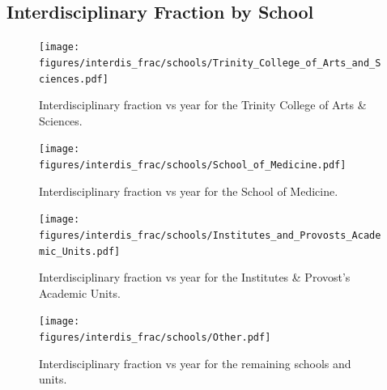 \documentclass[notitlepage,aps,prd,nofootinbib]{revtex4-1}
\newcommand{\figures}{../outputs/plots}
\begin{document}
\begin{appendices}
\section{Interdisciplinary Fraction by School}

\begin{figure}[!htb]\centering
  \texttt{[image: \\figures/interdis\_frac/schools/Trinity\_College\_of\_Arts\_and\_Sciences.pdf]}
  \caption{Interdisciplinary fraction vs year for the Trinity College of Arts \& Sciences.}
\end{figure}

\begin{figure}[!htb]\centering
  \texttt{[image: \\figures/interdis\_frac/schools/School\_of\_Medicine.pdf]}
  \caption{Interdisciplinary fraction vs year for the School of Medicine.}
\end{figure}

\begin{figure}[!htb]\centering
  \texttt{[image: \\figures/interdis\_frac/schools/Institutes\_and\_Provosts\_Academic\_Units.pdf]}
  \caption{Interdisciplinary fraction vs year for the Institutes \& Provost's Academic Units.}
\end{figure}

\begin{figure}[!htb]\centering
  \texttt{[image: \\figures/interdis\_frac/schools/Other.pdf]}
  \caption{Interdisciplinary fraction vs year for the remaining schools and units.}
\end{figure}

\end{appendices}
\end{document}

